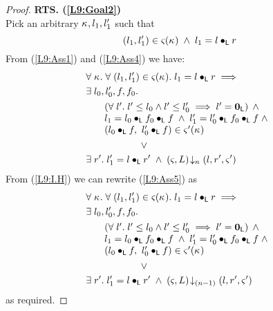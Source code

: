 \begin{lemma}[]
\begin{proof}
\noindent\textbf{RTS. (\ref{L9:Goal2})}\\
Pick an arbitrary $\kappa_{}, l_1, l'_1$ such that
%
\begin{equation}
	(l_1, l'_1) \in \varsigma_{}(\kappa_{}) \;\land\;  l_1 = l \bullet_{\textsf{L}} r   \label{L9:Ass4}
\end{equation}
%
From (\ref{L9:Ass1}) and (\ref{L9:Ass4}) we have:
%
\begin{align}
	&\for{\ca{}} \for{(l_1, l'_1) \in \amod{}(\ca{})} l_1 = l \composeL r \implies \nonumber\\
	&\exsts{l_0, l'_0, f, f_0} \nonumber\\
  &\hspace*{0.5cm}
  \begin{array}{l}
  	\left(\for{l'} l' \leq l_0 \land l' \leq l'_0 \implies l' = \unitL \right)\;\land\\
  	l_1 = l_0 \composeL f_0 \composeL f \;\land\; l'_1 = l'_0 \composeL f_0 \composeL f \;\land\\
  	(l_0 \composeL f,\ l'_0 \composeL f) \in \amod{}'(\ca{}) 
  \end{array} \nonumber\\
%
	&\hspace*{2cm}\lor  \nonumber\\
	&\exsts{r'} l'_1 = l \composeL r' \;\land\; \extendsAMUpto{\amod{}, L}{n}{l}{r'}{\amod{}'} \label{L9:Ass5}
\end{align}
%
From (\ref{L9:I.H}) we can rewrite (\ref{L9:Ass5}) as
%
\begin{align}
	&\for{\ca{}} \for{(l_1, l'_1) \in \amod{}(\ca{})} l_1 = l \composeL r \implies \nonumber\\
	&\exsts{l_0, l'_0, f, f_0} \nonumber\\
  &\hspace*{0.5cm}
  \begin{array}{l}
  	\left(\for{l'} l' \leq l_0 \land l' \leq l'_0 \implies l' = \unitL \right)\;\land\\
  	l_1 = l_0 \composeL f_0 \composeL f \;\land\; l'_1 = l'_0 \composeL f_0 \composeL f  \;\land\\
  	(l_0 \composeL f,\ l'_0 \composeL f) \in \amod{}'(\ca{}) 
  \end{array} \nonumber\\
%
	&\hspace*{2cm}\lor  \nonumber\\
	&\exsts{r'} l'_1 = l \composeL r' \;\land\; \extendsAMUpto{\amod{}, L}{(n-1)}{l}{r'}{\amod{}'} \label{L9:Ass6}
\end{align}
%
as required.
\end{proof}
\end{lemma}
